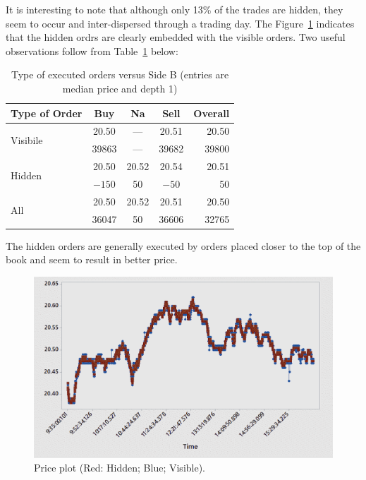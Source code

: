 It is interesting to note that although only 13\% of the trades are hidden, they seem to occur and inter-dispersed through a trading day. The Figure~\ref{fig:priceplothidvis} indicates that the hidden ordrs are clearly embedded with the visible orders. Two useful observations follow from Table~\ref{tab:typeexc} below:
	\begin{table}[!ht]
	\centering
	\caption{Type of executed orders versus Side B (entries are median price and depth 1) \label{tab:typeexc}}
	\begin{tabular}{l | ccc| r}
	Type of Order & Buy & Na & Sell & Overall \\ \hline
	\multirow{2}{*}{Visibile} & 20.50 & --- & 20.51 & 20.50 \\
	& 39863 & --- & 39682 & 39800 \\
	\multirow{2}{*}{Hidden} & 20.50 & 20.52 & 20.54 & 20.51 \\
	& $-150$ & 50 & $-50$ & 50 \\ \hline
	\multirow{2}{*}{All} & 20.50 & 20.52 & 20.51 & 20.50 \\
	& 36047 & 50 & 36606 & 32765
	\end{tabular}
	\end{table}
The hidden orders are generally executed by orders placed closer to the top of the book and seem to result in better price.
	\begin{figure}[!ht]
	\centering
	\includegraphics[width=1.0\textwidth]{chapters/chapter_trade_data_models/figures/priceplot.png}
	\caption{Price plot (Red: Hidden; Blue; Visible). \label{fig:priceplothidvis}}
	\end{figure}


